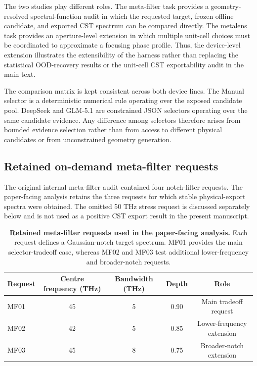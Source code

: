 \documentclass[final,1p,times]{elsarticle}
\begin{document}
The two studies play different roles. The meta-filter task provides a geometry-resolved spectral-function audit in which the requested target, frozen offline candidate, and exported CST spectrum can be compared directly. The metalens task provides an aperture-level extension in which multiple unit-cell choices must be coordinated to approximate a focusing phase profile. Thus, the device-level extension illustrates the extensibility of the harness rather than replacing the statistical OOD-recovery results or the unit-cell CST exportability audit in the main text.

The comparison matrix is kept consistent across both device lines. The Manual selector is a deterministic numerical rule operating over the exposed candidate pool. DeepSeek and GLM-5.1 are constrained JSON selectors operating over the same candidate evidence. Any difference among selectors therefore arises from bounded evidence selection rather than from access to different physical candidates or from unconstrained geometry generation.

\subsection{Retained on-demand meta-filter requests}

The original internal meta-filter audit contained four notch-filter requests. The paper-facing analysis retains the three requests for which stable physical-export spectra were obtained. The omitted 50 THz stress request is discussed separately below and is not used as a positive CST export result in the present manuscript.

\begin{table}[htbp!]
\centering
\caption{\textbf{Retained meta-filter requests used in the paper-facing analysis.}
Each request defines a Gaussian-notch target spectrum. MF01 provides the main selector-tradeoff case, whereas MF02 and MF03 test additional lower-frequency and broader-notch requests.}
\label{tab:si_phase6_metafilter_requests}
\small
\setlength{\tabcolsep}{5pt}
\renewcommand{\arraystretch}{1.12}
\begin{tabular}{lcccc}
\toprule
Request & Centre frequency (THz) & Bandwidth (THz) & Depth & Role \\
\midrule
MF01 & 45 & 5 & 0.90 & Main tradeoff request \\
MF02 & 42 & 5 & 0.85 & Lower-frequency extension \\
MF03 & 45 & 8 & 0.75 & Broader-notch extension \\
\bottomrule
\end{tabular}
\end{table}
\end{document}

